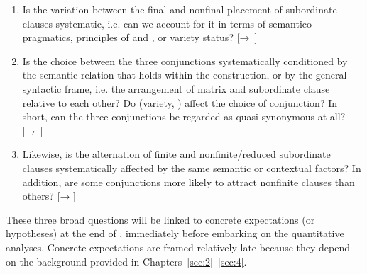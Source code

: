 \begin{enumerate}\sloppy
\item Is the variation between the final and nonfinal placement of subordinate clauses systematic, i.e. can we account for it in terms of semantico-prag\-mat\-ics, principles of  and , or variety status? [→~]
\item Is the choice between the three conjunctions systematically conditioned by the semantic relation that holds within the construction, or by the general syntactic frame, i.e. the arrangement of matrix and subordinate clause relative to each other? Do  (variety, ) affect the choice of conjunction? In short, can the three conjunctions be regarded as quasi-synonymous at all? [→~]
\item Likewise, is the alternation of finite and nonfinite/reduced subordinate clauses systematically affected by the same semantic or contextual factors? In addition, are some conjunctions more likely to attract nonfinite clauses than others? [→ ]
\end{enumerate}

These three broad questions will be linked to concrete expectations (or hypotheses) at the end of , immediately before embarking on the quantitative analyses. Concrete expectations are framed relatively late because they depend on the background provided in Chapters~\ref{sec:2}–\ref{sec:4}.

